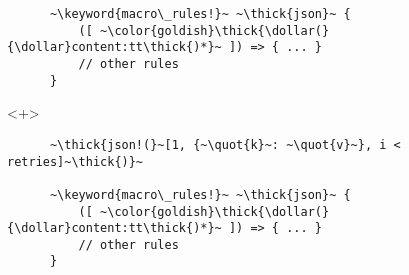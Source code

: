 \documentclass[usepdftitle=false,aspectratio=169]{beamer}
\newcommand{\dollar}{\makebox[\widthof{\$}][c]{\$}}
\newcommand{\thick}[1]{\contourlength{0.16pt}\contour[10]{black}{#1}}
\newcommand{\slantbox}[2][.5]
  {%
    \mbox
      {%
        \sbox{\foobox}{#2}%
        \hskip\wd\foobox
        \pdfsave
        \pdfsetmatrix{1 0 #1 1}%
        \llap{\usebox{\foobox}}%
        \pdfrestore
      }%
  }
\newcommand{\backslantbox}[2][.5]
  {%
    \mbox
      {%
        \sbox{\foobox}{#2}%
        \hskip\wd\foobox
        \pdfsave
        \pdfsetmatrix{-1 0 #1 1}%
        \llap{\usebox{\foobox}}%
        \pdfrestore
      }%
  }
\newcommand{\openquote}{\backslantbox[.2]{\hspace{11pt}''\hspace{-11pt}}}
\newcommand{\closequote}{\slantbox[-.2]{\hspace{2pt}''\hspace{-2pt}}}
\newcommand{\blackquote}[1]{\openquote#1\closequote}
\newcommand{\quot}[1]{{\color{redish}\blackquote{#1}}}
\newcommand{\keyword}[1]{\color{greenish}#1}
\begin{document}
\begin{frame}[fragile]
\begin{onlyenv}
\begin{verbatim}
      ~\keyword{macro\_rules!}~ ~\thick{json}~ {
          ([ ~\color{goldish}\thick{\dollar(}{\dollar}content:tt\thick{)*}~ ]) => { ... }
          // other rules
      }
    \end{verbatim}
  \end{onlyenv}
  \begin{onlyenv}<+>
    \vspace{-20.5pt}
    \begin{verbatim}
      ~\thick{json!(}~[1, {~\quot{k}~: ~\quot{v}~}, i < retries]~\thick{)}~

      ~\keyword{macro\_rules!}~ ~\thick{json}~ {
          ([ ~\color{goldish}\thick{\dollar(}{\dollar}content:tt\thick{)*}~ ]) => { ... }
          // other rules
      }
    \end{verbatim}
  \end{onlyenv}
\end{frame}
\end{document}
